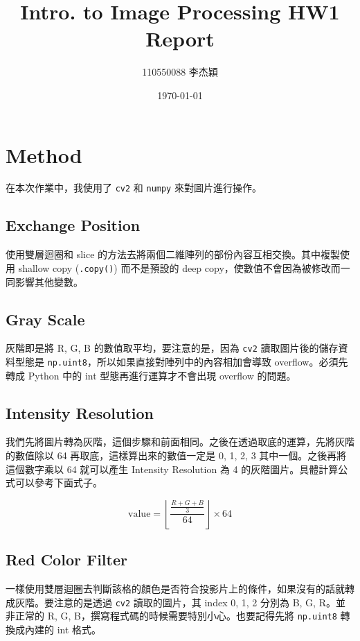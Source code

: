 \documentclass[twocolumn]{extarticle}
\title{Intro. to Image Processing HW1 Report}
\author{110550088 李杰穎}
\date{\today}
\begin{document}
\maketitle

\section{Method}

在本次作業中，我使用了 \texttt{cv2} 和 \texttt{numpy} 來對圖片進行操作。

\subsection{Exchange Position}

使用雙層迴圈和 slice 的方法去將兩個二維陣列的部份內容互相交換。其中複製使用 shallow copy (\texttt{.copy()}) 而不是預設的 deep copy，使數值不會因為被修改而一同影響其他變數。

\subsection{Gray Scale}

灰階即是將 R, G, B 的數值取平均，要注意的是，因為 \texttt{cv2} 讀取圖片後的儲存資料型態是 \texttt{np.uint8}，所以如果直接對陣列中的內容相加會導致 overflow。必須先轉成 Python 中的 int 型態再進行運算才不會出現 overflow 的問題。

\subsection{Intensity Resolution}

我們先將圖片轉為灰階，這個步驟和前面相同。之後在透過取底的運算，先將灰階的數值除以 64 再取底，這樣算出來的數值一定是 0, 1, 2, 3 其中一個。之後再將這個數字乘以 64 就可以產生 Intensity Resolution 為 4 的灰階圖片。具體計算公式可以參考下面式子。

\begin{equation}
	\text{value} = \left\lfloor\frac{\frac{R+G+B}{3}}{64}\right\rfloor \times 64
\end{equation}

\subsection{Red Color Filter}

一樣使用雙層迴圈去判斷該格的顏色是否符合投影片上的條件，如果沒有的話就轉成灰階。要注意的是透過 \texttt{cv2} 讀取的圖片，其 index 0, 1, 2 分別為 B, G, R。並非正常的 R, G, B，撰寫程式碼的時候需要特別小心。也要記得先將 \texttt{np.uint8} 轉換成內建的 int 格式。
\end{document}
